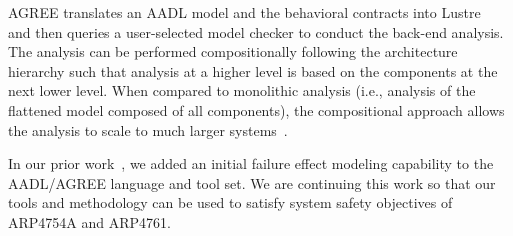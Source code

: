 AGREE translates an AADL model and the behavioral contracts into Lustre~\cite{Halbwachs91:IEEE} and then queries a user-selected
model checker to conduct the back-end analysis. The analysis %
can be performed compositionally following the architecture hierarchy such that analysis at a higher level is based on the components at the next lower level.  When compared to monolithic analysis (i.e., analysis of the flattened model composed of all components), the compositional approach allows the analysis to scale to much larger systems~\cite{NFM2012:CoGaMiWhLaLu}. 


In our prior work~\cite{Stewart17:IMBSA}, we added an initial failure effect modeling capability to the AADL/AGREE language and tool set.  We are continuing this work so that our tools and methodology can be used to satisfy system safety objectives of ARP4754A and ARP4761.  

\begin{comment}
In particular, our goals are to:

\begin{itemize}
	\item Provide a comprehensive, qualitative description of the causal relationship between basic failure events and system level safety requirements.
	\item Provide an accurate, quantitative description of the contribution relationship between failure rates of the fault tree basic events and numerical probability requirements at the system level.
\end{itemize}
\end{comment}



